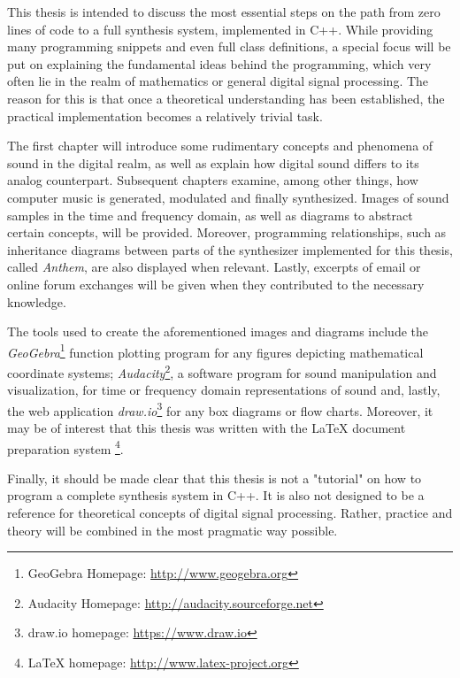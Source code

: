 \pagebreak

This thesis is intended to discuss the most essential steps on the path from zero lines of code to a full synthesis system, implemented in C++. While providing many programming snippets and even full class definitions\footnotemark{}, a special focus will be put on explaining the fundamental ideas behind the programming, which very often lie in the realm of mathematics or general digital signal processing. The reason for this is that once a theoretical understanding has been established, the practical implementation becomes a relatively trivial task.\parbreak


The first chapter will introduce some rudimentary concepts and phenomena of sound in the digital realm, as well as explain how digital sound differs to its analog counterpart. Subsequent chapters examine, among other things, how computer music is generated, modulated and finally synthesized. Images of sound samples in the time and frequency domain, as well as diagrams to abstract certain concepts, will be provided. Moreover, programming relationships, such as inheritance diagrams between parts of the synthesizer implemented for this thesis, called \emph{Anthem}, are also displayed when relevant. Lastly, excerpts of email or online forum exchanges will be given when they contributed to the necessary knowledge. \parbreak

The tools used to create the aforementioned images and diagrams include the \emph{GeoGebra}\footnote{GeoGebra Homepage: \url{http://www.geogebra.org}} function plotting program for any figures depicting mathematical coordinate systems; \emph{Audacity}\footnote{Audacity Homepage: \url{http://audacity.sourceforge.net}}, a software program for sound manipulation and visualization, for time or frequency domain representations of sound and, lastly, the web application \emph{draw.io}\footnote{draw.io homepage: \url{https://www.draw.io}} for any box diagrams or flow charts. Moreover, it may be of interest that this thesis was written with the \LaTeX{} document preparation system \footnote{\LaTeX{} homepage: \url{http://www.latex-project.org}}. \parbreak

Finally, it should be made clear that this thesis is not a "tutorial" on how to program a complete synthesis system in C++. It is also not designed to be a reference for theoretical concepts of digital signal processing. Rather, practice and theory will be combined in the most pragmatic way possible.
